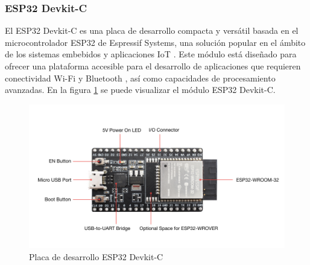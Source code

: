 \subsubsection{ESP32 Devkit-C}

 El ESP32 Devkit-C es una placa de desarrollo compacta y versátil basada en el microcontrolador ESP32 de Espressif Systems, una solución popular en el ámbito de los sistemas embebidos y aplicaciones IoT \cite{esp32}. Este módulo está diseñado para ofrecer una plataforma accesible para el desarrollo de aplicaciones que requieren conectividad Wi-Fi \cite{ieee_802.11} y Bluetooth \cite{bluetooth}, así como capacidades de procesamiento avanzadas. En la figura \ref{fig:esp32}
 se puede visualizar el módulo ESP32 Devkit-C. \\

 
\begin{figure}[H]
    \centering
    \includegraphics[width=\linewidth]{img/esp32.jpg}
    \caption{Placa de desarrollo ESP32 Devkit-C}
    \label{fig:esp32}
\end{figure}

